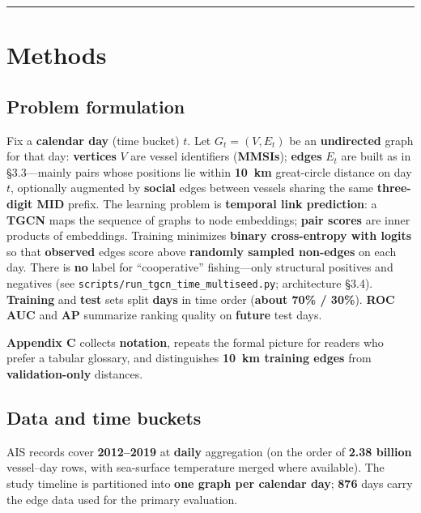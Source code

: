 \documentclass[
]{article}
\begin{document}
\begin{center}\rule{0.5\linewidth}{0.5pt}\end{center}

\section{Methods}\label{methods}

\subsection{Problem formulation}\label{problem-formulation}

Fix a \textbf{calendar day} (time bucket) \(t\). Let \(G_t = (V, E_t)\)
be an \textbf{undirected} graph for that day: \textbf{vertices} \(V\)
are vessel identifiers (\textbf{MMSIs}); \textbf{edges} \(E_t\) are
built as in §3.3---mainly pairs whose positions lie within
\textbf{10~km} great-circle distance on day \(t\), optionally augmented
by \textbf{social} edges between vessels sharing the same
\textbf{three-digit MID} prefix. The learning problem is
\textbf{temporal link prediction}: a \textbf{TGCN} maps the sequence of
graphs to node embeddings; \textbf{pair scores} are inner products of
embeddings. Training minimizes \textbf{binary cross-entropy with logits}
so that \textbf{observed} edges score above \textbf{randomly sampled
non-edges} on each day. There is \textbf{no} label for ``cooperative''
fishing---only structural positives and negatives (see
\texttt{scripts/run\_tgcn\_time\_multiseed.py}; architecture §3.4).
\textbf{Training} and \textbf{test} sets split \textbf{days} in time
order (\textbf{about 70\% / 30\%}). \textbf{ROC AUC} and \textbf{AP}
summarize ranking quality on \textbf{future} test days.

\textbf{Appendix C} collects \textbf{notation}, repeats the formal
picture for readers who prefer a tabular glossary, and distinguishes
\textbf{10~km training edges} from \textbf{validation-only} distances.

\subsection{Data and time buckets}\label{data-and-time-buckets}

AIS records cover \textbf{2012--2019} at \textbf{daily} aggregation (on
the order of \textbf{2.38 billion} vessel--day rows, with sea-surface
temperature merged where available). The study timeline is partitioned
into \textbf{one graph per calendar day}; \textbf{876} days carry the
edge data used for the primary evaluation.
\end{document}
